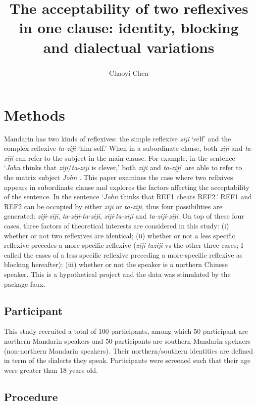 \documentclass[
  english,
  man,floatsintext]{apa6}
\title{The acceptability of two reflexives in one clause: identity, blocking and dialectual variations}
\author{Chaoyi Chen\textsuperscript{}}
\date{}
\affiliation{\vspace{0.5cm}\textsuperscript{1} Rutgers University}
\begin{document}
\maketitle

\hypertarget{methods}{%
\section{Methods}\label{methods}}

Mandarin has two kinds of reflexives: the simple reflexive \emph{ziji} `self' and the complex reflexive \emph{ta-ziji} `him-self.' When in a subordinate clause, both \emph{ziji} and \emph{ta-ziji} can refer to the subject in the main clause. For example, in the sentence `\emph{John} thinks that \emph{ziji}/\emph{ta-ziji} is clever,' both \emph{ziji} and \emph{ta-ziji}' are able to refer to the matrix subject \emph{John} . This paper examines the case where two reflxives appears in subordinate clause and explores the factors affecting the acceptability of the sentence. In the sentence `\emph{John} thinks that REF1 cheats REF2.' REF1 and REF2 can be occupied by either \emph{ziji} or \emph{ta-ziji}, thus four possibilities are generated: \emph{ziji}-\emph{ziji}, \emph{ta-ziji}-\emph{ta-ziji}, \emph{ziji}-\emph{ta-ziji} and \emph{ta-ziji}-\emph{ziji}. On top of these four cases, three factors of theoretical interests are considered in this study: (i) whether or not two reflexives are identical; (ii) whether or not a less specific reflexive precedes a more-specific reflexive (\emph{ziji}-\emph{taziji} vs the other three cases; I called the cases of a less specific reflexive preceding a more-specific reflexive as blocking hereafter); (iii) whether or not the speaker is a northern Chinese speaker. This is a hypothetical project and the data was stimulated by the package faux.

\hypertarget{participant}{%
\subsection{Participant}\label{participant}}

This study recruited a total of 100 participants, among which 50 participant are northern Mandarin speakers and 50 participants are southern Mandarin spekaers (non-northern Mandarin speakers). Their northern/southern identities are defined in term of the dialects they speak. Participants were screened such that their age were greater than 18 years old.

\hypertarget{procedure}{%
\subsection{Procedure}\label{procedure}}
\end{document}
